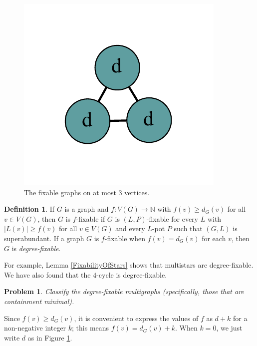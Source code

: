 \documentclass[12pt]{article}
\theoremstyle{plain}
\newtheorem*{problem}{Problem}
\theoremstyle{definition}
\newtheorem{defn}{Definition}
\theoremstyle{remark}
\newcommand{\IN}{\mathbb{N}}
\newcommand{\func}[3]{#1\colon #2 \rightarrow #3}
\begin{document}
\begin{figure}[htb]
		\includegraphics[scale=0.5]{Superabundance/all/111[2,2,2].pdf}
		\caption{The fixable graphs on at most 3 vertices.}
		\label{fig:fixable3}
	\end{figure}
	
	\begin{defn}
		If $G$ is a graph and $\func{f}{V(G)}{\IN}$ with $f(v) \ge d_G(v)$ for all $v \in V(G)$, then $G$ is $f$-fixable if $G$ is $(L, P)$-fixable for every $L$ with $|L(v)| \ge f(v)$ for all $v \in V(G)$ and every $L$-pot $P$ such that $(G,L)$ is superabundant.
If a graph $G$ is $f$-fixable when $f(v)=d_G(v)$ for each $v$, then $G$ is
\emph{degree-fixable}.
	\end{defn}
	
	For example, Lemma \ref{FixabilityOfStars} shows that multistars are
degree-fixable.  We have also found that the $4$-cycle is degree-fixable.
	
	\begin{problem}
	Classify the degree-fixable multigraphs (specifically, those that are
containment minimal).
	\end{problem} 
	
	Since $f(v) \ge d_G(v)$, it is convenient to express the values of $f$ as $d+k$ for a non-negative integer $k$; this means $f(v) = d_G(v) + k$.  When $k=0$, we just write $d$ as in Figure \ref{fig:fixable3}.  
	
\end{document}
